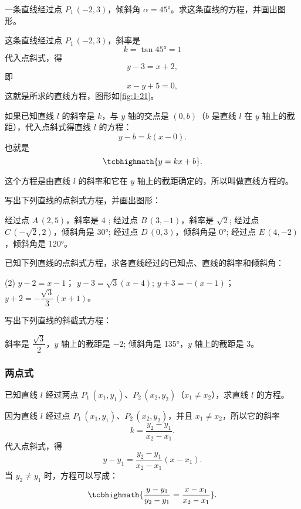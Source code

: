 \begin{example}
  一条直线经过点 $P_1\,(-2,3)$，倾斜角 $\alpha=\ang{45}$。求这条直线的方程，并画出图形。
\end{example}
\begin{solution}
  这条直线经过点 $P_1\,(-2,3)$，斜率是 
  \[k=\tan\ang{45}=1\]
  代入点斜式，得
  \[ y-3=x+2,\]
  即
  \[ x-y+5=0,\]
  这就是所求的直线方程，图形如\cref{fig:1-21}。
\end{solution}

如果已知直线 $l$ 的斜率是 $k$，与 $y$ 轴的交点是 $(0,b)$（$b$ 是直线 $l$ 在 $y$ 轴上的截距），代入点斜式得直线 $l$ 的方程：
\[ y-b=k(x-0). \]
也就是
\[ \tcbhighmath{y=kx+b}. \]

这个方程是由直线 $l$ 的斜率和它在 $y$ 轴上的截距确定的，所以叫做直线方程的。

\begin{Practice}
  \begin{question}
    \item 写出下列直线的点斜式方程，并画出图形：
    \begin{tasks}
      \task 经过点 $A\,(2,5)$，斜率是 4 ;
      \task 经过点 $B\,(3,-1)$，斜率是 $\sqrt{2}$;
      \task 经过点 $C\,(-\sqrt{2},2)$，倾斜角是 \ang{30};
      \task 经过点 $D\,(0,3)$，倾斜角是 \ang{0};
      \task 经过点 $E\,(4,-2)$，倾斜角是 \ang{120}。
    \end{tasks}
    \item 已知下列直线的点斜式方程，求各直线经过的已知点、直线的斜率和倾斜角：
    \begin{tasks}(2)
      \task $y-2=x - 1$；
      \task $y-3=\sqrt{3}(x-4)$;
      \task $y+3=-(x-1)$；
      \task $y+2=-\dfrac{\sqrt{3}}{3}(x+1) $。
    \end{tasks}
    \item 写出下列直线的斜截式方程：
    \begin{tasks}
      \task 斜率是 $\dfrac{\sqrt{3}}{2}$，$y$ 轴上的截距是 $-2$;
      \task 倾斜角是 \ang{135}，$y$ 轴上的截距是 3。
    \end{tasks}
  \end{question}
\end{Practice}

\subsubsection{两点式}
已知直线 $l$ 经过两点 $P_1\,(x_1,y_1)$、$P_2\,(x_2,y_2)$（$x_1\neq x_2$），求直线 $l$ 的方程。

因为直线 $l$ 经过点 $P_1\,(x_1,y_1)$、$P_2\,(x_2,y_2)$，并且 $x_1\neq x_2$，所以它的斜率 
\[k = \frac{y_2-y_1}{x_2-x_1}.\] 
代入点斜式，得
\[ y-y_1 =\frac{y_2-y_1}{x_2-x_1}(x-x_1).\]
当 $y_2\neq y_1$ 时，方程可以写成：
\[ \tcbhighmath{\frac{y-y_1}{y_2-y_1} = \frac{x-x_1}{x_2-x_1}}.\]

